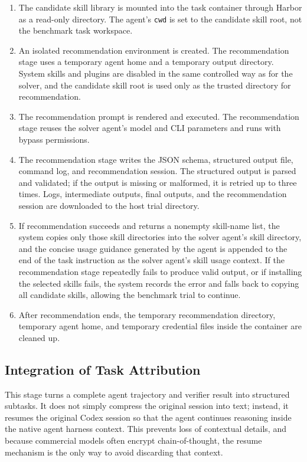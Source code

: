 \documentclass{llmxive}
\begin{document}
\begin{enumerate}
    \item The candidate skill library is mounted into the task container through Harbor as a read-only directory. The agent's \texttt{cwd} is set to the candidate skill root, not the benchmark task workspace.
    \item An isolated recommendation environment is created. The recommendation stage uses a temporary agent home and a temporary output directory. System skills and plugins are disabled in the same controlled way as for the solver, and the candidate skill root is used only as the trusted directory for recommendation.
    \item The recommendation prompt is rendered and executed. The recommendation stage reuses the solver agent's model and CLI parameters and runs with bypass permissions.
    \item The recommendation stage writes the JSON schema, structured output file, command log, and recommendation session. The structured output is parsed and validated; if the output is missing or malformed, it is retried up to three times. Logs, intermediate outputs, final outputs, and the recommendation session are downloaded to the host trial directory.
    \item If recommendation succeeds and returns a nonempty skill-name list, the system copies only those skill directories into the solver agent's skill directory, and the concise usage guidance generated by the agent is appended to the end of the task instruction as the solver agent's skill usage context. If the recommendation stage repeatedly fails to produce valid output, or if installing the selected skills fails, the system records the error and falls back to copying all candidate skills, allowing the benchmark trial to continue.
    \item After recommendation ends, the temporary recommendation directory, temporary agent home, and temporary credential files inside the container are cleaned up.
\end{enumerate}

\subsection{Integration of Task Attribution}
This stage turns a complete agent trajectory and verifier result into structured subtasks. It does not simply compress the original session into text; instead, it resumes the original Codex session so that the agent continues reasoning inside the native agent harness context. This prevents loss of contextual details, and because commercial models often encrypt chain-of-thought, the resume mechanism is the only way to avoid discarding that context.
\end{document}
